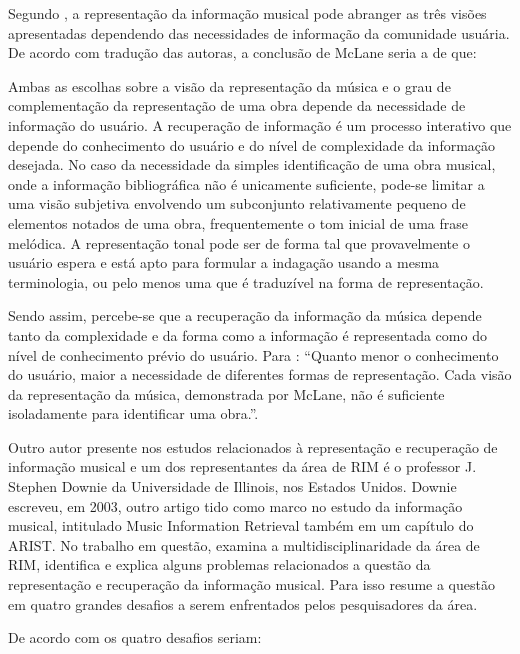 Segundo , a representação da informação musical pode abranger as três visões apresentadas dependendo das necessidades de informação da comunidade usuária. De acordo com tradução das autoras, a conclusão de McLane seria a de que:

\begin{citacao}
Ambas as escolhas sobre a visão da representação da música e o grau de complementação da representação de uma obra depende da necessidade de informação do usuário. A recuperação de informação é um processo interativo que depende do conhecimento do usuário e do nível de complexidade da informação desejada. No caso da necessidade da simples identificação de uma obra musical, onde a informação bibliográfica não é unicamente suficiente, pode-se limitar a uma visão subjetiva envolvendo um subconjunto relativamente pequeno de elementos notados de uma obra, frequentemente o tom inicial de uma frase melódica. A representação tonal pode ser de forma tal que provavelmente o usuário espera e está apto para formular a indagação usando a mesma terminologia, ou pelo menos uma que é traduzível na forma de representação.
\end{citacao}

Sendo assim, percebe-se que a recuperação da informação da música depende tanto da complexidade e da forma como a informação é representada como do nível de conhecimento prévio do usuário. Para : “Quanto menor o conhecimento do usuário, maior a necessidade de diferentes formas de representação. Cada visão da representação da música, demonstrada por McLane, não é suficiente isoladamente para identificar uma obra.”.

Outro autor presente nos estudos relacionados à representação e recuperação de informação musical e um dos representantes da área de RIM é o professor J. Stephen Downie da Universidade de Illinois, nos Estados Unidos. Downie escreveu, em 2003, outro artigo tido como marco no estudo da informação musical, intitulado Music Information Retrieval também em um capítulo do ARIST. No trabalho em questão,  examina a multidisciplinaridade da área de RIM, identifica e explica alguns problemas relacionados a questão da representação e recuperação da informação musical. Para isso  resume a questão em quatro grandes desafios a serem enfrentados pelos pesquisadores da área.

De acordo com  os quatro desafios seriam:

